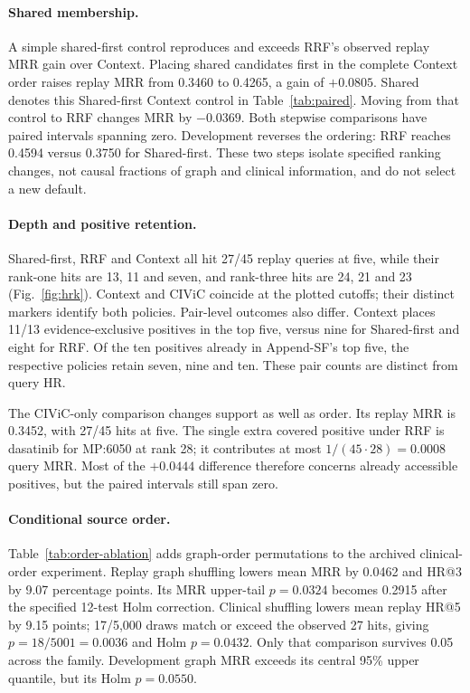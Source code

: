 \paragraph{Shared membership.}
A simple shared-first control reproduces and exceeds RRF's observed replay MRR gain over Context. Placing shared candidates first in the complete Context order raises replay MRR from 0.3460 to 0.4265, a gain of $+0.0805$. Shared denotes this Shared-first Context control in Table~\ref{tab:paired}. Moving from that control to RRF changes MRR by $-0.0369$. Both stepwise comparisons have paired intervals spanning zero. Development reverses the ordering: RRF reaches 0.4594 versus 0.3750 for Shared-first. These two steps isolate specified ranking changes, not causal fractions of graph and clinical information, and do not select a new default.

\paragraph{Depth and positive retention.}
Shared-first, RRF and Context all hit 27/45 replay queries at five, while their rank-one hits are 13, 11 and seven, and rank-three hits are 24, 21 and 23 (Fig.~\ref{fig:hrk}). Context and CIViC coincide at the plotted cutoffs; their distinct markers identify both policies. Pair-level outcomes also differ. Context places 11/13 evidence-exclusive positives in the top five, versus nine for Shared-first and eight for RRF. Of the ten positives already in Append-SF's top five, the respective policies retain seven, nine and ten. These pair counts are distinct from query HR.


The CIViC-only comparison changes support as well as order. Its replay MRR is 0.3452, with 27/45 hits at five. The single extra covered positive under RRF is dasatinib for MP:6050 at rank 28; it contributes at most $1/(45\cdot28)=0.0008$ query MRR. Most of the $+0.0444$ difference therefore concerns already accessible positives, but the paired intervals still span zero.

\paragraph{Conditional source order.}
Table~\ref{tab:order-ablation} adds graph-order permutations to the archived clinical-order experiment. Replay graph shuffling lowers mean MRR by 0.0462 and HR@3 by 9.07 percentage points. Its MRR upper-tail $p=0.0324$ becomes 0.2915 after the specified 12-test Holm correction. Clinical shuffling lowers mean replay HR@5 by 9.15 points; 17/5,000 draws match or exceed the observed 27 hits, giving $p=18/5001=0.0036$ and Holm $p=0.0432$. Only that comparison survives 0.05 across the family. Development graph MRR exceeds its central 95\% upper quantile, but its Holm $p=0.0550$.


